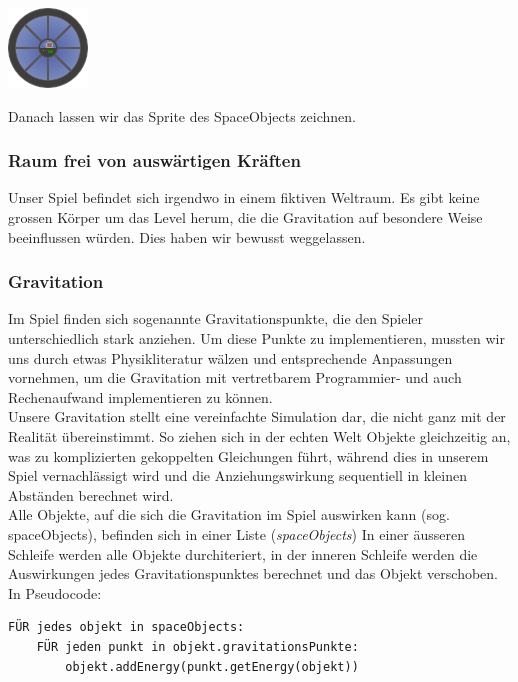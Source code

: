 \documentclass[12pt,a4paper]{scrartcl}
\begin{document}
\begin{center}
\includegraphics[scale=1]{img/spieler.png}
\end{center}

Danach lassen wir das Sprite des SpaceObjects zeichnen.




\subsubsection{Raum frei von auswärtigen Kräften}
Unser Spiel befindet sich irgendwo in einem fiktiven Weltraum. Es gibt keine grossen Körper um das
Level herum, die die Gravitation auf besondere Weise beeinflussen würden. Dies haben wir bewusst weggelassen.


\subsubsection{Gravitation}
Im Spiel finden sich sogenannte Gravitationspunkte, die den Spieler unterschiedlich stark anziehen.
Um diese Punkte zu implementieren, mussten wir uns durch etwas Physikliteratur wälzen und entsprechende
Anpassungen vornehmen, um die Gravitation mit vertretbarem Programmier- und auch Rechenaufwand implementieren zu können.  \\

Unsere Gravitation stellt eine vereinfachte Simulation dar, die nicht ganz mit der Realität übereinstimmt.
So ziehen sich in der echten Welt Objekte gleichzeitig an, was zu komplizierten gekoppelten Gleichungen führt, während dies in
unserem Spiel vernachlässigt wird und die Anziehungswirkung sequentiell in kleinen Abständen berechnet wird.\\

Alle Objekte, auf die sich die Gravitation im Spiel auswirken kann (sog. spaceObjects), befinden sich in einer Liste (\textit{spaceObjects})
In einer äusseren Schleife werden alle Objekte durchiteriert, in der inneren Schleife werden die Auswirkungen jedes Gravitationspunktes berechnet und
das Objekt verschoben. In Pseudocode:
\begin{verbatim}
FÜR jedes objekt in spaceObjects:
    FÜR jeden punkt in objekt.gravitationsPunkte:
        objekt.addEnergy(punkt.getEnergy(objekt))
\end{verbatim}
\end{document}
